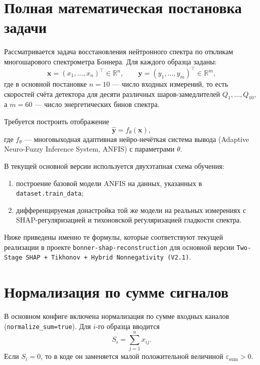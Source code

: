 \documentclass[11pt]{article}
\begin{document}
\section{Полная математическая постановка задачи}

Рассматривается задача восстановления нейтронного спектра по откликам многошарового спектрометра Боннера. Для каждого образца заданы:
\begin{equation}
\mathbf{x} = (x_1,\dots,x_n)^\top \in \mathbb{R}^n,
\qquad
\mathbf{y} = (y_1,\dots,y_m)^\top \in \mathbb{R}^m,
\end{equation}
где в основной постановке $n=10$ --- число входных измерений, то есть скоростей счёта детектора для десяти различных шаров-замедлителей $Q_1,\dots,Q_{10}$, а $m=60$ --- число энергетических бинов спектра.

Требуется построить отображение
\begin{equation}
\hat{\mathbf{y}} = f_{\theta}(\mathbf{x}),
\end{equation}
где $f_{\theta}$ --- многовыходная адаптивная нейро-нечёткая система вывода (Adaptive Neuro-Fuzzy Inference System, ANFIS) с параметрами $\theta$.

В текущей основной версии используется двухэтапная схема обучения:
\begin{enumerate}
    \item построение базовой модели ANFIS на данных, указанных в \texttt{dataset.train\_data};
    \item дифференцируемая донастройка той же модели на реальных измерениях с SHAP-регуляризацией и тихоновской регуляризацией гладкости спектра.
\end{enumerate}

Ниже приведены именно те формулы, которые соответствуют текущей реализации в проекте \texttt{bonner-shap-reconstruction} для основной версии \texttt{Two-Stage SHAP + Tikhonov + Hybrid Nonnegativity (V2.1)}.

\section{Нормализация по сумме сигналов}

В основном конфиге включена нормализация по сумме входных каналов (\texttt{normalize\_sum=true}). Для $i$-го образца вводится
\begin{equation}
S_i = \sum_{j=1}^{n} x_{ij}.
\end{equation}
Если $S_i = 0$, то в коде он заменяется малой положительной величиной $\varepsilon_{\mathrm{sum}} > 0$.
\end{document}
